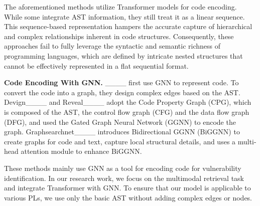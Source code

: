 The aforementioned methods utilize Transformer models for code encoding. While some integrate AST information, they still treat it as a linear sequence. This sequence-based representation hampers the accurate capture of hierarchical and complex relationships inherent in code structures. Consequently, these approaches fail to fully leverage the syntactic and semantic richness of programming languages, which are defined by intricate nested structures that cannot be effectively represented in a flat sequential format.



\noindent 
\textbf{Code Encoding With GNN.}
____ first use GNN to represent code. To convert the code into a graph, they design complex edges based on the AST. Devign____ and Reveal____ adopt the Code Property Graph (CPG), which is composed of the AST, the control flow graph (CFG) and the data flow graph (DFG), and used the Gated Graph Neural Network (GGNN) to encode the graph. 
Graphsearchnet____ introduces Bidirectional GGNN (BiGGNN) to create graphs for code and text, capture local structural details, and uses a multi-head attention module to enhance BiGGNN.

These methods mainly use GNN as a tool for encoding code for vulnerability identification. In our research work, we focus on the multimodal retrieval task and integrate Transformer with GNN.
To ensure that our model is applicable to various PLs, we use only the basic AST without adding complex edges or nodes. 


